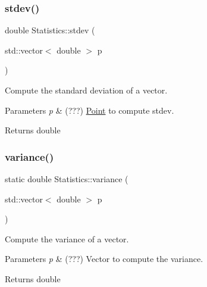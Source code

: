 \subsubsection{\texorpdfstring{stdev()}{stdev()}}
{\footnotesize\ttfamily double Statistics\+::stdev (\begin{DoxyParamCaption}\item[{std\+::vector$<$ double $>$}]{p }\end{DoxyParamCaption})\hspace{0.3cm}{\ttfamily [static]}}



Compute the standard deviation of a vector. 


\begin{DoxyParams}{Parameters}
{\em p} & (???) \hyperlink{class_point}{Point} to compute stdev. \\
\hline
\end{DoxyParams}
\begin{DoxyReturn}{Returns}
double 
\end{DoxyReturn}
\mbox{\label{class_statistics_af3a74e0ab944341356b8afeb9fc0ecbd}} 
\subsubsection{\texorpdfstring{variance()}{variance()}\hspace{0.1cm}{\footnotesize\ttfamily [1/2]}}
{\footnotesize\ttfamily static double Statistics\+::variance (\begin{DoxyParamCaption}\item[{std\+::vector$<$ double $>$}]{p }\end{DoxyParamCaption})\hspace{0.3cm}{\ttfamily [static]}}



Compute the variance of a vector. 


\begin{DoxyParams}{Parameters}
{\em p} & (???) Vector to compute the variance. \\
\hline
\end{DoxyParams}
\begin{DoxyReturn}{Returns}
double 
\end{DoxyReturn}
\mbox{\label{class_statistics_a0390754b117a9b7a637b44992ed2ebf6}} 
